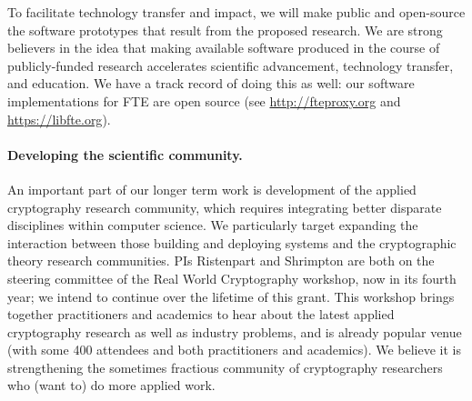To facilitate technology transfer and impact, 
we will make public and open-source the software prototypes that result from the
proposed research. We are strong believers in the idea that making available software 
produced in the course of publicly-funded research accelerates scientific
advancement, technology transfer, and education.
We have a track record of doing this as well: 
our software implementations for FTE are open
source (see \url{http://fteproxy.org} and \url{https://libfte.org}). 










\paragraph{Developing the scientific community.} An important part of our longer
term work is development of the applied cryptography research community, which
requires integrating better disparate disciplines within computer science. We
particularly target expanding the interaction between those building and
deploying systems and the cryptographic theory research communities.  PIs
Ristenpart and Shrimpton are both on the steering committee of the Real World
Cryptography workshop, now in its fourth year; we intend to continue
over the lifetime of this grant.  This workshop brings
together practitioners and academics to hear about the latest applied
cryptography research as well as industry problems, and is already
popular venue (with some 400 attendees and both practitioners and
academics). We believe it is strengthening the sometimes fractious community of
cryptography researchers who (want to) do more applied work. 

